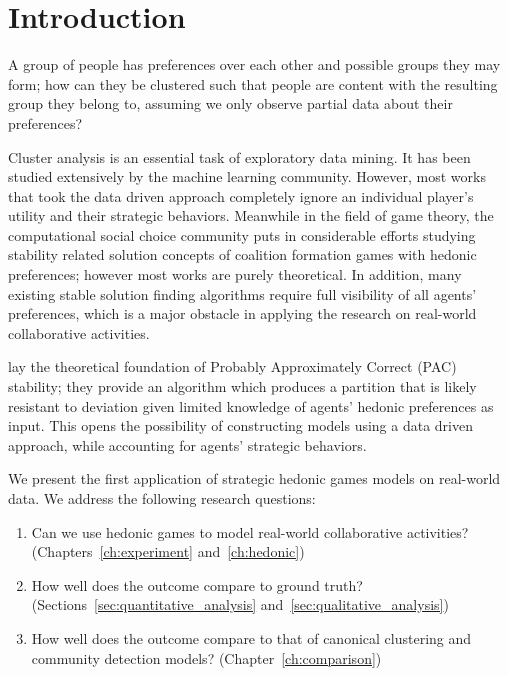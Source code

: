 
\chapter{Introduction}
\label{ch:intro}

A group of people has preferences over each other and possible groups they may
form; how can they be clustered such that people are content with the resulting
group they belong to, assuming we only observe partial data about their
preferences?

Cluster analysis is an essential task of exploratory data mining.
It has been studied extensively by the machine learning community.
However, most works that took the data driven approach completely ignore an
individual player's utility and their strategic behaviors.
Meanwhile in the field of game theory, the computational social choice
community puts in considerable efforts studying stability related solution
concepts of coalition formation games with hedonic preferences;
however most works are purely theoretical.
In addition, many existing stable solution finding algorithms require full
visibility of all agents' preferences, which is a major obstacle in applying
the research on real-world collaborative activities.

 lay the theoretical foundation of Probably
Approximately Correct (PAC) stability; they provide an algorithm which
produces a partition that is likely resistant to deviation given limited
knowledge of agents' hedonic preferences as input.  
This opens the possibility of constructing models using a data driven
approach, while accounting for agents' strategic behaviors.

We present the first application of strategic hedonic games models on
real-world data.
We address the following research questions:
\begin{enumerate}
    \item Can we use hedonic games to model real-world collaborative
      activities? (Chapters~\ref{ch:experiment} and~\ref{ch:hedonic})
    \item How well does the outcome compare to ground truth?
      (Sections~\ref{sec:quantitative_analysis}
      and~\ref{sec:qualitative_analysis})
    \item How well does the outcome compare to that of canonical clustering
      and community detection models? (Chapter~\ref{ch:comparison})
\end{enumerate}

